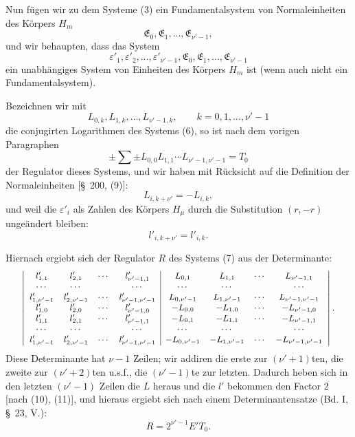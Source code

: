 \documentclass[11pt]{article}
\begin{document}
Nun fügen wir zu dem Systeme (3) ein Fundamentalsystem von Normaleinheiten des Körpers $H_m$
\begin{equation}
\mathfrak E_0,\mathfrak E_1,\ldots,\mathfrak E_{\nu'-1},
\tag{6}
\end{equation}
und wir behaupten, dass das System
\begin{equation}
\varepsilon'_1,\varepsilon'_2,
\ldots,\varepsilon'_{\nu'-1},\mathfrak E_0,\mathfrak E_1,
\ldots,\mathfrak E_{\nu'-1}
\tag{7}
\end{equation}
ein unabhängiges System von Einheiten des Körpers $H_m$ ist (wenn auch nicht ein Fundamentalsystem).

Bezeichnen wir mit
\begin{equation}
L_{0,k},L_{1,k},\ldots,L_{\nu'-1,k},\qquad k=0,1,\ldots,\nu'-1
\tag{8}
\end{equation}
die conjugirten Logarithmen des Systems (6), so ist nach dem vorigen Paragraphen
\begin{equation}
\pm\sum\pm L_{0,0}L_{1,1}\cdots L_{\nu'-1,\nu'-1}=T_0
\tag{9}
\end{equation}
der Regulator dieses Systems, und wir haben mit Rücksicht auf die Definition der Normaleinheiten [\S~200, (9)]:
\begin{equation}
L_{i,k+\nu'}=-L_{i,k},
\tag{10}
\end{equation}
und weil die $\varepsilon'_i$ als Zahlen des Körpers $H_\mu$ durch die Substitution $(r,-r)$ ungeändert bleiben:
\begin{equation}
l'_{i,k+\nu'}=l'_{i,k}.
\tag{11}
\end{equation}

Hiernach ergiebt sich der Regulator $R$ des Systems (7) aus der Determinante:
\[
\small
\left|\begin{array}{cccc|cccc}
l'_{1,1}&l'_{2,1}&\cdots&l'_{\nu'-1,1}&L_{0,1}&L_{1,1}&\cdots&L_{\nu'-1,1}\\
\cdots&\cdots&&\cdots&\cdots&\cdots&&\cdots\\
l'_{1,\nu'-1}&l'_{2,\nu'-1}&\cdots&l'_{\nu'-1,\nu'-1}&L_{0,\nu'-1}&L_{1,\nu'-1}&\cdots&L_{\nu'-1,\nu'-1}\\
l'_{1,0}&l'_{2,0}&\cdots&l'_{\nu'-1,0}&-L_{0,0}&-L_{1,0}&\cdots&-L_{\nu'-1,0}\\
l'_{1,1}&l'_{2,1}&\cdots&l'_{\nu'-1,1}&-L_{0,1}&-L_{1,1}&\cdots&-L_{\nu'-1,1}\\
\cdots&\cdots&&\cdots&\cdots&\cdots&&\cdots\\
l'_{1,\nu'-1}&l'_{2,\nu'-1}&\cdots&l'_{\nu'-1,\nu'-1}&-L_{0,\nu'-1}&-L_{1,\nu'-1}&\cdots&-L_{\nu'-1,\nu'-1}
\end{array}\right|.
\]
Diese Determinante hat $\nu-1$ Zeilen; wir addiren die erste zur $(\nu'+1)$ten, die zweite zur $(\nu'+2)$ten u.s.f., die $(\nu'-1)$te zur letzten. Dadurch heben sich in den letzten $(\nu'-1)$ Zeilen die $L$ heraus und die $l'$ bekommen den Factor 2 [nach (10), (11)], und hieraus ergiebt sich nach einem Determinantensatze (Bd. I, \S~23, V.):
\begin{equation}
R=2^{\nu'-1}E'T_0.
\tag{12}
\end{equation}
\end{document}
